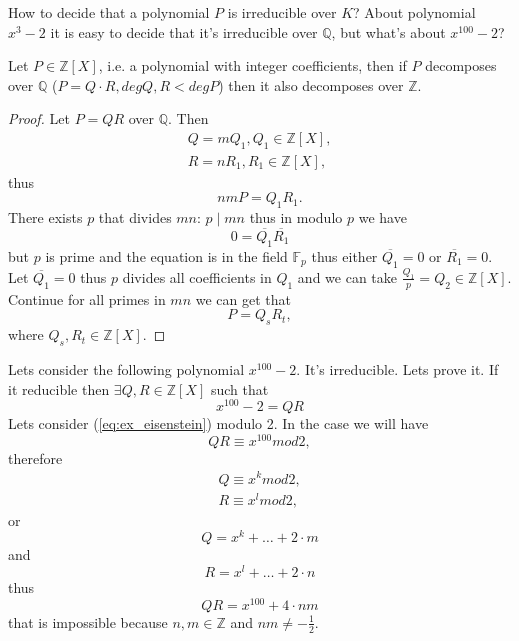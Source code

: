 How to decide that a polynomial $P$ is irreducible over $K$?
About polynomial $x^3 - 2$ it is easy to decide that it's irreducible
over $\mathbb{Q}$, but what's about $x^{100}-2$?

\begin{lemma}[Gauss]
  Let $P \in \mathbb{Z}\left[X\right]$, i.e. a polynomial with integer
  coefficients, then if $P$ decomposes over $\mathbb{Q}$ ($P = Q\cdot
  R, deg Q,R < deg P$) then it also decomposes over $\mathbb{Z}$.
  \begin{proof}
    Let $P = Q R$ over $\mathbb{Q}$. Then
    \begin{eqnarray}
      Q = m Q_1, Q_1 \in \mathbb{Z}\left[X\right],
      \nonumber \\
      R = n R_1, R_1 \in \mathbb{Z}\left[X\right],
      \nonumber
    \end{eqnarray}
    thus
    \[
    n m P = Q_1 R_1. 
    \]
    There exists $p$ that divides $mn$: $p \mid mn$ thus in modulo $p$
    we have
    \[
    0 = \overline{Q_1}\overline{R_1}
    \]
    but $p$ is prime and the equation is in the field $\mathbb{F}_p$
    thus either $\overline{Q_1} = 0$ or $\overline{R_1} = 0$. Let
    $\overline{Q_1} = 0$ thus $p$ divides all coefficients in $Q_1$
    and we can take $\frac{Q_1}{p} = Q_2 \in
    \mathbb{Z}\left[X\right]$. Continue for all primes in $mn$ we can
    get that
    \[
    P = Q_s R_t,
    \]
    where $Q_s, R_t \in \mathbb{Z}\left[X\right]$.
  \end{proof}
  \label{lem:gauss}
\end{lemma}

\begin{example}
  Lets consider the following polynomial $x^{100} -2$. It's
  irreducible. Lets prove it. If it reducible then
  $\exists Q, R \in \mathbb{Z}\left[X\right]$ such that
  \begin{equation}
    x^{100} -2 = Q R
    \label{eq:ex_eisenstein}
  \end{equation}
  Lets consider (\ref{eq:ex_eisenstein}) modulo 2. In the case we will
  have
  \[
  Q R \equiv x^{100} mod 2,
  \]
  therefore
  \begin{eqnarray}
    Q \equiv x^k mod 2,
    \nonumber \\
    R \equiv x^l mod 2,
    \nonumber
  \end{eqnarray}
  or
  \[
  Q = x^k + \dots + 2 \cdot m
  \]
  and
  \[
  R = x^l + \dots + 2 \cdot n
  \]
  thus
  \[
  QR = x^{100} + 4 \cdot nm
  \]
  that is impossible because $n,m \in \mathbb{Z}$ and $nm \ne
  -\frac{1}{2}$. 
  \label{ex:eisenstein}
\end{example}

